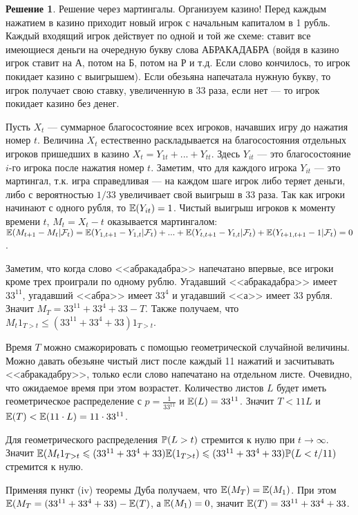 \documentclass[pdftex,12pt,a4paper]{article}
\numberwithin{equation}{page} %
\theoremstyle{definition} %
\theoremstyle{definition}
\theoremstyle{definition}
\newtheorem*{solution}{Решение}
\theoremstyle{definition}
\begin{document}
\begin{solution}
Решение через мартингалы.  Организуем казино! Перед каждым нажатием в казино приходит
новый игрок с начальным капиталом в 1 рубль. Каждый входящий игрок
действует по одной и той же схеме: ставит все имеющиеся деньги на
очередную букву слова АБРАКАДАБРА (войдя в казино игрок ставит на А, потом на Б, потом на Р и т.д. Если слово кончилось, то игрок покидает казино с выигрышем). Если обезьяна напечатала нужную букву, то игрок получает свою ставку, увеличенную в 33 раза, если нет --- то игрок покидает казино без денег. 

Пусть $X_{t}$ --- суммарное благосостояние всех игроков, начавших игру до нажатия номер $t$. Величина $X_{t}$ естественно раскладывается на благосостояния отдельных игроков пришедших в казино $X_{t}=Y_{1t}+...+Y_{tt}$. Здесь $Y_{it}$ --- это благосостояние $i$-го игрока после нажатия номер $t$. Заметим, что для каждого игрока $Y_{it}$ --- это мартингал, т.к. игра справедливая --- на каждом шаге игрок либо теряет деньги, либо с вероятностью $1/33$ увеличивает свой выигрыш в 33 раза. Так как игроки начинают с одного рубля, то $\E(Y_{it})=1$. Чистый выигрыш игроков к моменту времени $t$, $M_{t}=X_{t}-t$ оказывается мартингалом: $\E(M_{t+1}-M_{t}|\mathcal{F}_{t})=\E(Y_{1,t+1}-Y_{1,t}|\mathcal{F}_{t})+...+\E(Y_{t,t+1}-Y_{t,t}|\mathcal{F}_{t})+\E(Y_{t+1,t+1}-1|\mathcal{F}_{t})=0$.

Заметим, что когда слово <<абракадабра>> напечатано впервые, все игроки кроме трех проиграли по одному рублю. Угадавший <<абракадабра>> имеет $33^{11}$, угадавший <<абра>> имеет $33^{4}$ и угадавший <<а>> имеет $33$ рубля. Значит $M_{T}=33^{11}+33^{4}+33-T$. Также получаем, что $M_{t}1_{T>t}\leq (33^{11}+33^{4}+33)1_{T>t}$.

Время $T$ можно смажорировать с помощью геометрической случайной величины. Можно давать обезьяне чистый лист после каждый 11 нажатий и засчитывать <<абракадабру>>, только если слово напечатано на отдельном листе. Очевидно, что ожидаемое время при этом возрастет. Количество листов $L$ будет иметь геометрическое распределение с $p=\frac{1}{33^{11}}$ и $\E(L)=33^{11}$. Значит $T<11L$ и $\E(T)<\E(11\cdot L)=11\cdot 33^{11}$. 

Для геометрического распределения $\P(L>t)$ стремится к нулю при $t\to\infty$. Значит $\E(M_{t}1_{T>t}\leq (33^{11}+33^{4}+33)\E(1_{T>t})\leq (33^{11}+33^{4}+33) \P(L<t/11)$ стремится к нулю.

Применяя пункт (iv) теоремы Дуба получаем, что $\E(M_{T})=\E(M_{1})$. При этом $\E(M_{T}=(33^{11}+33^{4}+33)-\E(T)$, а $\E(M_{1})=0$, значит $\E(T)=33^{11}+33^{4}+33$.


\end{solution}
\end{document}
